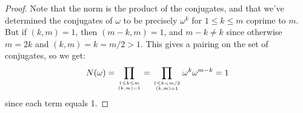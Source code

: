 \begin{proof} 
    Note that the norm is the product of the conjugates, and that we've determined the conjugates of $\omega$ to be precisely $\omega^k$ for $1 \leq k \leq m$ coprime to $m$. But if $(k,m) = 1$, then $(m-k,m) = 1$, and $m-k \neq k$ since otherwise $m = 2k$ and $(k,m) = k = m/2 > 1$. This gives a pairing on the set of conjugates, so we get:
    \[ N(\omega) = \prod_{1 \leq k \leq m \atop (k,m) = 1} = \prod_{1 \leq k < m/2 \atop (k,m) = 1} \omega^k\omega^{m-k} = 1 \]
    since each term equals 1.
\end{proof}
